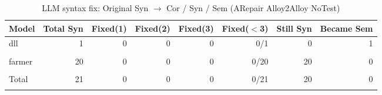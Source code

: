 \begin{table}[h]
\centering
\caption{LLM syntax fix: Original Syn $\rightarrow$ Cor / Syn / Sem (ARepair Alloy2Alloy NoTest)}
\label{tab:syn_fix_arepairalloy2alloynotest}
\begin{tabular}{|l|r|r|r|r|r|r|r|}
\hline
Model & Total Syn & Fixed(1) & Fixed(2) & Fixed(3) & Fixed($<$3) & Still Syn & Became Sem \\
\hline
dll & 1 & 0 & 0 & 0 & 0/1 & 0 & 1 \\\\
\hline
farmer & 20 & 0 & 0 & 0 & 0/20 & 20 & 0 \\\\
\hline
Total & 21 & 0 & 0 & 0 & 0/21 & 20 & 0 \\\\
\hline
\end{tabular}
\end{table}
